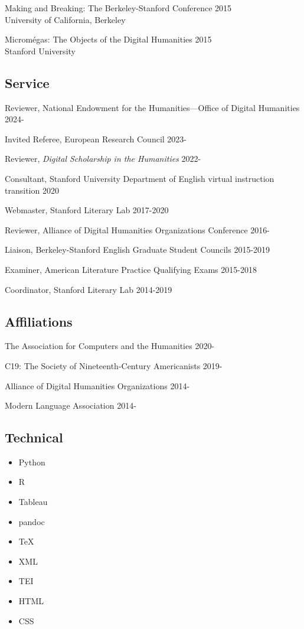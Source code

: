 \documentclass[
  12pt,
  letterpaper,
]{article}
\providecommand{\tightlist}{%
  \setlength{\itemsep}{0pt}\setlength{\parskip}{0pt}}
\begin{document}
Making and Breaking: The Berkeley-Stanford Conference \hfill 2015\\
University of California, Berkeley

Micromégas: The Objects of the Digital Humanities \hfill 2015\\
Stanford University

\hypertarget{service}{%
\subsection{Service}\label{service}}

Reviewer, National Endowment for the Humanities—Office of Digital Humanities \hfill 2024-

Invited Referee, European Research Council \hfill 2023-

Reviewer, \emph{Digital Scholarship in the Humanities} \hfill 2022-

Consultant, Stanford University Department of English virtual
instruction transition \hfill 2020

Webmaster, Stanford Literary Lab \hfill 2017-2020

Reviewer, Alliance of Digital Humanities Organizations Conference
\hfill 2016-

Liaison, Berkeley-Stanford English Graduate Student Councils
\hfill 2015-2019

Examiner, American Literature Practice Qualifying Exams \hfill 2015-2018

Coordinator, Stanford Literary Lab \hfill 2014-2019

\hypertarget{affiliations}{%
\subsection{Affiliations}\label{affiliations}}

The Association for Computers and the Humanities \hfill 2020-

C19: The Society of Nineteenth-Century Americanists \hfill 2019-

Alliance of Digital Humanities Organizations \hfill 2014-

Modern Language Association \hfill 2014-

\hypertarget{technical}{%
\subsection{Technical}\label{technical}}

\begin{itemize}
\tightlist
\item
  Python
\item
  R
\item
  Tableau
\item
  pandoc
\item
  TeX
\item
  XML
\item
  TEI
\item
  HTML
\item
  CSS
\end{itemize}
\end{document}
